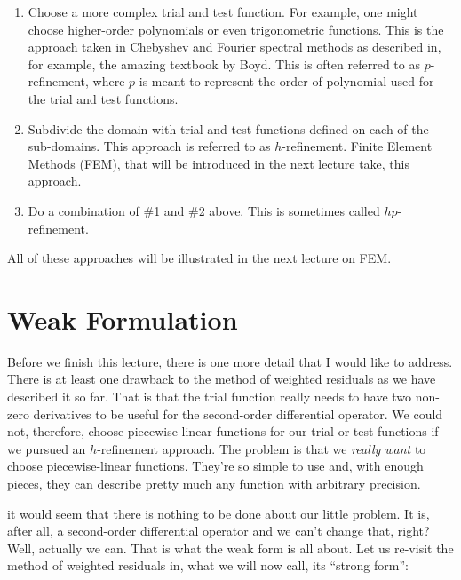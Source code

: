 \begin{enumerate}
\item Choose a more complex trial and test function.  For example, one might choose higher-order polynomials or even trigonometric functions. This is the approach taken in Chebyshev and Fourier spectral methods as described in, for example, the amazing textbook by Boyd.\cite{boyd}  This is often referred to as $p$-refinement, where $p$ is meant to represent the order of polynomial used for the trial and test functions.

\item Subdivide the domain with trial and test functions defined on each of the sub-domains.  This approach is referred to as $h$-refinement.  Finite Element Methods (FEM), that will be introduced in the next lecture take, this approach.  

\item Do a combination of \#1 and \#2 above.  This is sometimes called $hp$-refinement.
\end{enumerate}  
All of these approaches will be illustrated in the next lecture on FEM.

\section{Weak Formulation}
Before we finish this lecture, there is one more detail that I would like to address.  There is at least one drawback to the method of weighted residuals as we have described it so far.  That is that the trial function really needs to have two non-zero derivatives to be useful for the second-order differential operator.  We could not, therefore, choose piecewise-linear functions for our trial or test functions if we pursued an $h$-refinement approach.  The problem is that we \emph{really want} to choose piecewise-linear functions.  They're so simple to use and, with enough pieces, they can describe pretty much any function with arbitrary precision.  

 it would seem that there is nothing to be done about our little problem.  It is, after all, a second-order differential operator and we can't change that, right?  Well, actually we can.  That is what the weak form is all about.  Let us re-visit the method of weighted residuals in, what we will now call, its ``strong form'':

